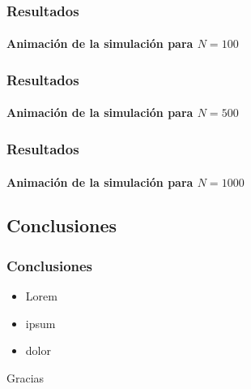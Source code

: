 \documentclass[hyperref={pdfpagelayout=SinglePage}]{beamer}
\begin{document}
\begin{frame}
\frametitle{Resultados}
\framesubtitle{Animación de la simulación para $N = 100$}
\begin{figure}[H]
	\centering
\end{figure}
\end{frame}

\begin{frame}
\frametitle{Resultados}
\framesubtitle{Animación de la simulación para $N = 500$}
\begin{figure}[H]
	\centering
\end{figure}
\end{frame}

\begin{frame}
\frametitle{Resultados}
\framesubtitle{Animación de la simulación para $N = 1000$}
\begin{figure}[H]
	\centering
\end{figure}
\end{frame}

\subsection{Conclusiones}

\begin{frame}
\frametitle{Conclusiones}
\begin{itemize}
	\item Lorem
	\item ipsum
	\item dolor
\end{itemize}
\end{frame}

\begin{frame}[plain,c]
\begin{center}
	\Huge Gracias
\end{center}
\end{frame}
\end{document}

